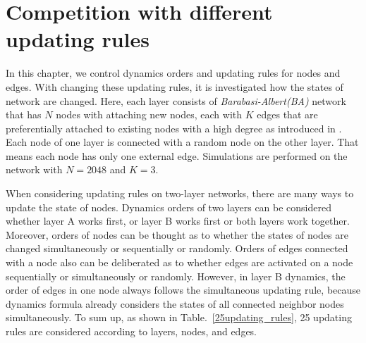 
\chapter{Competition with different updating rules}
\label{chap4}
In this chapter, we control dynamics orders and updating rules for nodes and edges. With changing these updating rules, it is investigated how the states of network are changed. Here, each layer consists of \textit{Barabasi-Albert(BA)} network that has $N$ nodes with attaching new nodes, each with $K$ edges that are preferentially attached to existing nodes with a high degree as introduced in \parencite{barabasi1999}. Each node of one layer is connected with a random node on the other layer. That means each node has only one external edge. Simulations are performed on the network with $N=2048$ and $K=3$.

When considering updating rules on two-layer networks, there are many ways to update the state of nodes. Dynamics orders of two layers can be considered whether layer A works first, or layer B works first or both layers work together. Moreover, orders of nodes can be thought as to whether the states of nodes are changed simultaneously or sequentially or randomly. Orders of edges connected with a node also can be deliberated as to whether edges are activated on a node sequentially or simultaneously or randomly. However, in layer B dynamics, the order of edges in one node always follows the simultaneous updating rule, because dynamics formula already considers the states of all connected neighbor nodes simultaneously. To sum up, as shown in Table.~\ref{25updating_rules}, 25 updating rules are considered according to layers, nodes, and edges.

